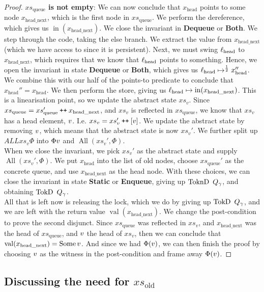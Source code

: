 \documentclass[a4paper, 10pt]{report}
\theoremstyle{definition}
\newcommand{\xsqueue}{xs_{\mathrm{queue}}}
\newcommand{\xsold}{xs_{\mathrm{old}}}
\newcommand{\AllP}{\operatorname{All}}
\newcommand{\locN}[1]{\loc_{\mathrm{#1}}}
\newcommand{\lochead}{\locN{head}}
\newcommand{\nIn}[1]{\operatorname{in}(#1)}
\newcommand{\nVal}[1]{\operatorname{val}(#1)}
\newcommand{\node}{x}
\newcommand{\nodeN}[1]{\node_{\mathrm{#1}}}
\newcommand{\nodehead}{\nodeN{head}}
\newcommand{\nodeheadnext}{\nodeN{head\_next}}
\newcommand{\absvalue}{\val}
\newcommand{\absvalueList}{xs_v}
\newcommand{\StaticState}{\textbf{Static}}
\newcommand{\EnqueueState}{\textbf{Enqueue}}
\newcommand{\DequeueState}{\textbf{Dequeue}}
\newcommand{\BothState}{\textbf{Both}}
\newcommand{\Qg}{Q_\gname}
\newcommand{\TokD}[1]{\operatorname{TokD} ~ #1}
\newcommand{\TokDQg}{\TokD{\Qg}}
\newcommand{\ToknD}[1]{\operatorname{ToknD} ~ #1}
\newcommand{\ToknDQg}{\ToknD{\Qg}}
\newcommand\catenate{\mathbin{\text{\ttfamily\upshape ++}}}
\begin{document}
\begin{proof}
\textbf{$\xsqueue$ is not empty}:
We can now conclude that $\nodehead$ points to some node $\nodeheadnext$, which is the first node in $\xsqueue$. We perform the dereference, which gives us $\nIn{\nodeheadnext}$. We close the invariant in \DequeueState{} or \BothState{}. We step through the code, taking the else branch. We extract the value from $\nodeheadnext$ (which we have access to since it is persistent). Next, we must swing $\lochead$ to $\nodeheadnext$, which requires that we know that $\lochead$ points to something. Hence, we open the invariant in state \DequeueState{} or \BothState{}, which gives us $\lochead \mapsto^{\frac{1}{2}} \nodehead''$. We combine this with our half of the points-to predicate to conclude that $\nodehead'' = \nodehead$. We then perform the store, giving us $\lochead \mapsto \nIn{\nodeheadnext}$. This is a linearisation point, so we update the abstract state $\absvalueList$. Since $\xsqueue = \xsqueue' \catenate \nodeheadnext$, and $\absvalueList$ is reflected in $\xsqueue$, we know that $\absvalueList$ has a head element, $\absvalue$. I.e. $\absvalueList = \absvalueList' \catenate [\absvalue]$. We update the abstract state by removing $\absvalue$, which means that the abstract state is now $\absvalueList'$. We further split up $ALL \absvalueList \Phi$ into $\Phi \absvalue$ and $\AllP(\absvalueList', \Phi)$.\\
When we close the invariant, we pick $\absvalueList'$ as the abstract state and supply $\AllP(\absvalueList', \Phi)$. We put $\nodehead$ into the list of old nodes, choose $\xsqueue'$ as the concrete queue, and use $\nodeheadnext$ as the head node. With these choices, we can close the invariant in state \StaticState{} or \EnqueueState{}, giving up $\ToknDQg$, and obtaining $\TokDQg$.\\
All that is left now is releasing the lock, which we do by giving up $\TokDQg$, and we are left with the return value $\nVal{\nodeheadnext}$. We change the post-condition to prove the second disjunct. Since $\xsqueue$ was reflected in $\absvalueList$, and $\nodeheadnext$ was the head of $\xsqueue$, and $\absvalue$ the head of $\absvalueList$, then we can conclude that $\nVal{\nodeheadnext} = \Some \absvalue$. And since we had $\Phi(\absvalue)$, we can then finish the proof by choosing $\absvalue$ as the witness in the post-condition and frame away $\Phi(\absvalue)$.
\end{proof}

\subsection[Discussing need for xs\_old]{Discussing the need for $\xsold$}\label{TLMSQ:Discussion:xs_old}
\end{document}
